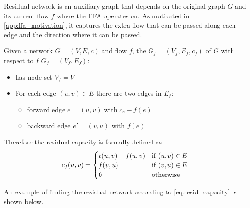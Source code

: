 \documentclass[a4paper]{article}
\begin{document}
Residual network is an auxiliary graph that depends on the original graph $G$ and its current flow $f$ where the FFA operates on. As motivated in \ref{app:ffa_motivation}, it captures the extra flow that can be passed along each edge and the direction where it can be passed.
\begin{definition}
Given a network $G=(V,E,c)$ and flow $f$, the  $G_f=(V_f, E_f, c_f)$  of $G$ with respect to $f$ $G_f = (V_f,E_f)$:
\begin{itemize}
    \item has node set $V_f=V$
    \item For each edge $(u,v) \in E$ there are two edges in $E_f$:
    \begin{itemize}
        \item forward edge $e=(u,v)$ with  $c_e - f(e)$
        \item backward edge $e'=(v,u)$ with  $f(e)$
    \end{itemize}
\end{itemize}
\end{definition}

Therefore the residual capacity is formally defined as
\begin{equation}
  c_f(u,v) =
  \begin{cases}
     c(u,v) - f(u,v)  & \text{if $ (u,v) \in E$} \\
     f(v,u) & \text{if $ (v,u) \in E$} \\
     0 & \text{otherwise}
  \end{cases}\
  \label{eq:resid_capacity}
\end{equation}


An example of finding the residual network according to \eqref{eq:resid_capacity} is shown below.
\end{document}
